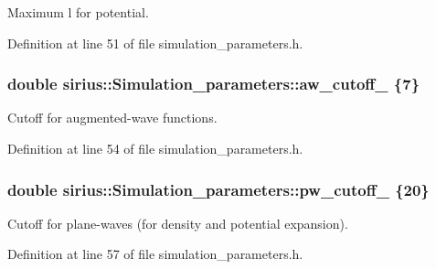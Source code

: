 Maximum l for potential. 



Definition at line 51 of file simulation\+\_\+parameters.\+h.

\hypertarget{classsirius_1_1_simulation__parameters_a55eab5c9318a8071c20ee21284beaa32}{}
\subsubsection[{aw\+\_\+cutoff\+\_\+}]{\setlength{\rightskip}{0pt plus 5cm}double sirius\+::\+Simulation\+\_\+parameters\+::aw\+\_\+cutoff\+\_\+ \{7\}\hspace{0.3cm}{\ttfamily [protected]}}\label{classsirius_1_1_simulation__parameters_a55eab5c9318a8071c20ee21284beaa32}


Cutoff for augmented-\/wave functions. 



Definition at line 54 of file simulation\+\_\+parameters.\+h.

\hypertarget{classsirius_1_1_simulation__parameters_a4f720f85686b486b29992c508ff94491}{}
\subsubsection[{pw\+\_\+cutoff\+\_\+}]{\setlength{\rightskip}{0pt plus 5cm}double sirius\+::\+Simulation\+\_\+parameters\+::pw\+\_\+cutoff\+\_\+ \{20\}\hspace{0.3cm}{\ttfamily [protected]}}\label{classsirius_1_1_simulation__parameters_a4f720f85686b486b29992c508ff94491}


Cutoff for plane-\/waves (for density and potential expansion). 



Definition at line 57 of file simulation\+\_\+parameters.\+h.

\hypertarget{classsirius_1_1_simulation__parameters_a219a43b81780aa1c53b037b748970de8}{}
